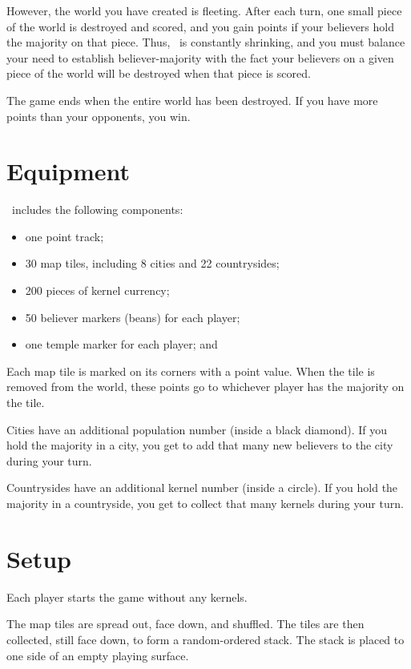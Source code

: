 However, the world you have created is fleeting.
After each turn, one small piece of the world is destroyed and scored, and you gain points if your believers hold the majority on that piece.
Thus, \gameName\ is constantly shrinking, and you must balance your need to establish believer-majority with the fact your believers on a given piece of the world will be destroyed when that piece is scored.

The game ends when the entire world has been destroyed.
If you have more points than your opponents, you win.


\section{Equipment}

\gameName\ includes the following components: 
\begin{itemize}
  \item one point track;
  \item 30 map tiles, including 8 cities and 22 countrysides;
  \item 200 pieces of kernel currency;
  \item 50 believer markers (beans) for each player; 
  \item one temple marker for each player;  and
\end{itemize}
Each map tile is marked on its corners with a point value.
When the tile is removed from the world, these points go to whichever player has the majority on the tile.

Cities have an additional population number (inside a black diamond).
If you hold the majority in a city, you get to add that many new believers to the city during your turn.

Countrysides have an additional kernel number (inside a circle).
If you hold the majority in a countryside, you get to collect that many kernels during your turn.



\section{Setup}


Each player starts the game without any kernels.  

The map tiles are spread out, face down, and shuffled.
The tiles are then collected, still face down, to form a random-ordered stack.
The stack is placed to one side of an empty playing surface.

